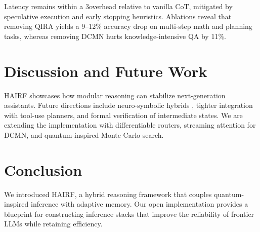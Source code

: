 \documentclass[11pt]{article}
\begin{document}
Latency remains within a 3\times overhead relative to vanilla CoT, mitigated by speculative execution and early stopping heuristics.  Ablations reveal that removing QIRA yields a 9--12\% accuracy drop on multi-step math and planning tasks, whereas removing DCMN hurts knowledge-intensive QA by 11\%.

\section{Discussion and Future Work}
HAIRF showcases how modular reasoning can stabilize next-generation assistants.  Future directions include neuro-symbolic hybrids \citep{zhang2024cumulative}, tighter integration with tool-use planners, and formal verification of intermediate states.  We are extending the implementation with differentiable routers, streaming attention for DCMN, and quantum-inspired Monte Carlo search.

\section{Conclusion}
We introduced HAIRF, a hybrid reasoning framework that couples quantum-inspired inference with adaptive memory.  Our open implementation provides a blueprint for constructing inference stacks that improve the reliability of frontier LLMs while retaining efficiency.



\end{document}
